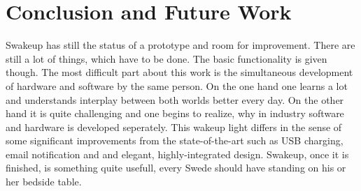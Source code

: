\chapter{Conclusion and Future Work}
\label{chap:conclusion}
Swakeup has still the status of a prototype and room for improvement. There are
still a lot of things, which have to be done. The basic functionality is given
though. The most difficult part about this work is the simultaneous
development of hardware and software by the same person. On the one hand one
learns a lot and understands interplay between both worlds better every day. On
the other hand it is quite challenging and one begins to realize, why
in industry software and hardware is developed seperately.  \newpar This wakeup
light differs in the sense of some significant improvements from the
state-of-the-art such as USB charging, email notification and and elegant,
highly-integrated design. Swakeup, once it is finished, is something quite
usefull, every Swede should have standing on his or her bedside table. 
